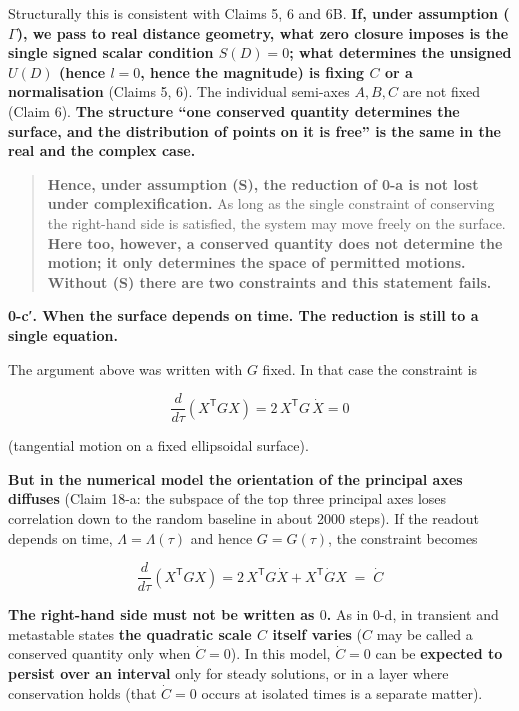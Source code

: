 \documentclass[
  10pt,
]{article}
\begin{document}
Structurally this is consistent with Claims 5, 6 and 6B. \textbf{If,
under assumption (\(\Gamma\)), we pass to real distance geometry, what
zero closure imposes is the single signed scalar condition \(S(D)=0\);
what determines the unsigned \(U(D)\) (hence \(l=0\), hence the
magnitude) is fixing \(C\) or a normalisation} (Claims 5, 6). The
individual semi-axes \(A, B, C\) are not fixed (Claim 6). \textbf{The
structure ``one conserved quantity determines the surface, and the
distribution of points on it is free'' is the same in the real and the
complex case.}

\begin{quote}
\textbf{Hence, under assumption (S), the reduction of 0-a is not lost
under complexification.} As long as the single constraint of conserving
the right-hand side is satisfied, the system may move freely on the
surface. \textbf{Here too, however, a conserved quantity does not
determine the motion; it only determines the space of permitted
motions.} \textbf{Without (S) there are two constraints and this
statement fails.}
\end{quote}

\textbf{0-c′. When the surface depends on time. The reduction is still
to a single equation.}

The argument above was written with \(G\) fixed. In that case the
constraint is

\[\frac{d}{d\tau}\left(X^{\mathsf T}GX\right) = 2\,X^{\mathsf T}G\,\dot X = 0\]

(tangential motion on a fixed ellipsoidal surface).

\textbf{But in the numerical model the orientation of the principal axes
diffuses} (Claim 18-a: the subspace of the top three principal axes
loses correlation down to the random baseline in about 2000 steps). If
the readout depends on time, \(\Lambda = \Lambda(\tau)\) and hence
\(G = G(\tau)\), the constraint becomes

\[\boxed{\;\frac{d}{d\tau}\left(X^{\mathsf T}G X\right) = 2\,X^{\mathsf T}G\dot X + X^{\mathsf T}\dot G X \;=\; \dot C\;}\]

\textbf{The right-hand side must not be written as \(0\).} As in 0-d, in
transient and metastable states \textbf{the quadratic scale \(C\) itself
varies} (\(C\) may be called a conserved quantity only when
\(\dot C = 0\)). In this model, \(\dot C = 0\) can be \textbf{expected
to persist over an interval} only for steady solutions, or in a layer
where conservation holds (that \(\dot C=0\) occurs at isolated times is
a separate matter).
\end{document}
